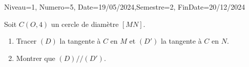 \documentclass[a4paper,12pt]{article}
\begin{document}
\begin{Maquette}[DM]{Niveau=1, Numero=5, Date=19/05/2024,Semestre=2, FinDate=20/12/2024}
\begin{exercice}
Soit $C(O,4)$ un cercle de diamètre $[MN]$.
\begin{enumerate}
\item Tracer $(D)$ la tangente à $C$ en $M$ et $(D')$ la tangente à $C$ en $N$.
\item Montrer que $(D)//(D')$.
\end{enumerate}
\end{exercice}

\end{Maquette}
\end{document}
